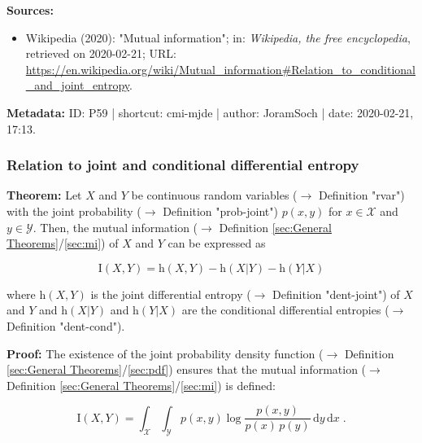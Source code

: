 \documentclass[a4paper,12pt]{book}
\begin{document}
\vspace{1em}
\textbf{Sources:}
\begin{itemize}
\item Wikipedia (2020): "Mutual information"; in: \textit{Wikipedia, the free encyclopedia}, retrieved on 2020-02-21; URL: \url{https://en.wikipedia.org/wiki/Mutual_information#Relation_to_conditional_and_joint_entropy}.
\end{itemize}


\vspace{1em}
\textbf{Metadata:} ID: P59 | shortcut: cmi-mjde | author: JoramSoch | date: 2020-02-21, 17:13.


\subsubsection[\textbf{Relation to joint and conditional differential entropy}]{Relation to joint and conditional differential entropy} \label{sec:cmi-jcde}

\vspace{1em}
\textbf{Theorem:} Let $X$ and $Y$ be continuous random variables ($\rightarrow$ Definition "rvar") with the joint probability ($\rightarrow$ Definition "prob-joint") $p(x,y)$ for $x \in \mathcal{X}$ and $y \in \mathcal{Y}$. Then, the mutual information ($\rightarrow$ Definition \ref{sec:General Theorems}/\ref{sec:mi}) of $X$ and $Y$ can be expressed as

\begin{equation} \label{eq:cmi-jcde-dmi-jce}
\mathrm{I}(X,Y) = \mathrm{h}(X,Y) - \mathrm{h}(X|Y) - \mathrm{h}(Y|X)
\end{equation}

where $\mathrm{h}(X,Y)$ is the joint differential entropy ($\rightarrow$ Definition "dent-joint") of $X$ and $Y$ and $\mathrm{h}(X \vert Y)$ and $\mathrm{h}(Y \vert X)$ are the conditional differential entropies ($\rightarrow$ Definition "dent-cond").


\vspace{1em}
\textbf{Proof:} The existence of the joint probability density function ($\rightarrow$ Definition \ref{sec:General Theorems}/\ref{sec:pdf}) ensures that the mutual information ($\rightarrow$ Definition \ref{sec:General Theorems}/\ref{sec:mi}) is defined:

\begin{equation} \label{eq:cmi-jcde-MI}
\mathrm{I}(X,Y) = \int_{\mathcal{X}} \int_{\mathcal{Y}} p(x,y) \log \frac{p(x,y)}{p(x)\,p(y)} \, \mathrm{d}y \, \mathrm{d}x \; .
\end{equation}
\end{document}
